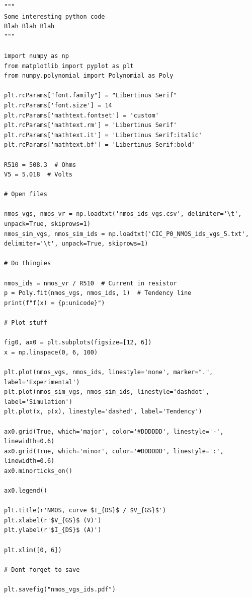 \begin{code}
\label{code:apx:a:python}
\begin{verbatim}
"""
Some interesting python code 
Blah Blah Blah
"""

import numpy as np
from matplotlib import pyplot as plt
from numpy.polynomial import Polynomial as Poly

plt.rcParams["font.family"] = "Libertinus Serif"
plt.rcParams['font.size'] = 14
plt.rcParams['mathtext.fontset'] = 'custom'
plt.rcParams['mathtext.rm'] = 'Libertinus Serif'
plt.rcParams['mathtext.it'] = 'Libertinus Serif:italic'
plt.rcParams['mathtext.bf'] = 'Libertinus Serif:bold'

R510 = 508.3  # Ohms
V5 = 5.018  # Volts

# Open files

nmos_vgs, nmos_vr = np.loadtxt('nmos_ids_vgs.csv', delimiter='\t', unpack=True, skiprows=1)
nmos_sim_vgs, nmos_sim_ids = np.loadtxt('CIC_P0_NMOS_ids_vgs_5.txt', delimiter='\t', unpack=True, skiprows=1)

# Do thingies

nmos_ids = nmos_vr / R510  # Current in resistor
p = Poly.fit(nmos_vgs, nmos_ids, 1)  # Tendency line
print(f"f(x) = {p:unicode}")

# Plot stuff

fig0, ax0 = plt.subplots(figsize=[12, 6])
x = np.linspace(0, 6, 100)

plt.plot(nmos_vgs, nmos_ids, linestyle='none', marker=".", label='Experimental')
plt.plot(nmos_sim_vgs, nmos_sim_ids, linestyle='dashdot', label='Simulation')
plt.plot(x, p(x), linestyle='dashed', label='Tendency')

ax0.grid(True, which='major', color='#DDDDDD', linestyle='-', linewidth=0.6)
ax0.grid(True, which='minor', color='#DDDDDD', linestyle=':', linewidth=0.6)
ax0.minorticks_on()

ax0.legend()

plt.title(r'NMOS, curve $I_{DS}$ / $V_{GS}$')
plt.xlabel(r'$V_{GS}$ (V)')
plt.ylabel(r'$I_{DS}$ (A)')

plt.xlim([0, 6])

# Dont forget to save

plt.savefig("nmos_vgs_ids.pdf")
\end{verbatim}
\end{code}

